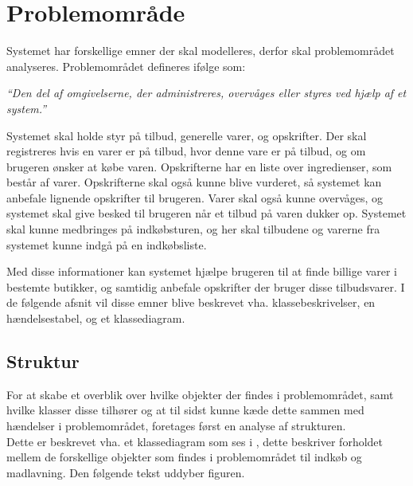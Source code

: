 \chapter{Problemområde}

Systemet har forskellige emner der skal modelleres, derfor skal problemområdet analyseres.
Problemområdet defineres ifølge \citep{OOA&D2001} som:

\textit{``Den del af omgivelserne, der administreres, overvåges eller styres ved hjælp af et system.''}

Systemet skal holde styr på tilbud, generelle varer, og opskrifter. 
Der skal registreres hvis en varer er på tilbud, hvor denne vare er på tilbud, og om brugeren ønsker at købe varen.
Opskrifterne har en liste over ingredienser, som består af varer. 
Opskrifterne skal også kunne blive vurderet, så systemet kan anbefale lignende opskrifter til brugeren.
Varer skal også kunne overvåges, og systemet skal give besked til brugeren når et tilbud på varen dukker op.
Systemet skal kunne medbringes på indkøbsturen, og her skal tilbudene og varerne fra systemet kunne indgå på en indkøbsliste.

Med disse informationer kan systemet hjælpe brugeren til at finde billige varer i bestemte butikker, og samtidig anbefale opskrifter der bruger disse tilbudsvarer.
I de følgende afsnit vil disse emner blive beskrevet vha. klassebeskrivelser, en hændelsestabel, og et klassediagram.

\section{Struktur}\label{sec:struktur}
For at skabe et overblik over hvilke objekter der findes i problemområdet, samt hvilke klasser disse tilhører og at til sidst kunne kæde dette sammen med hændelser i problemområdet, foretages først en analyse af strukturen.\\


Dette er beskrevet vha. et klassediagram som ses i , dette beskriver forholdet mellem de forskellige objekter som findes i problemområdet til indkøb og madlavning. Den følgende tekst uddyber figuren.

